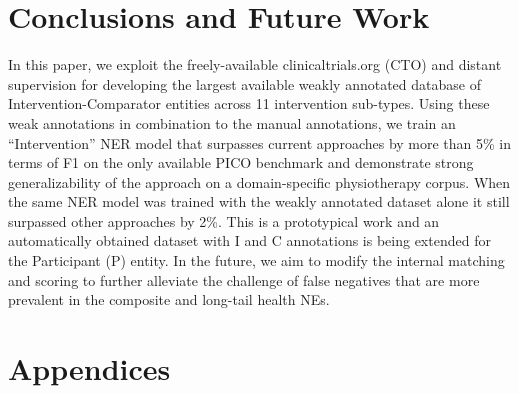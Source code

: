 \documentclass[letterpaper]{article} %
\begin{document}
\section{Conclusions and Future Work}
\label{sec:conclusion}
%
In this paper, we exploit the freely-available clinicaltrials.org (CTO) and distant supervision for developing the largest available weakly annotated database of Intervention-Comparator entities across 11 intervention sub-types.
Using these weak annotations in combination to the manual annotations, we train an ``Intervention'' NER model that surpasses current approaches by more than 5\% in terms of F1 on the only available PICO benchmark and demonstrate strong generalizability of the approach on a domain-specific physiotherapy corpus.
When the same NER model was trained with the weakly annotated dataset alone it still surpassed other approaches by 2\%.
This is a prototypical work and an automatically obtained dataset with I and C annotations is being extended for the Participant (P) entity.
In the future, we aim to modify the internal matching and scoring to further alleviate the challenge of false negatives that are more prevalent in the composite and long-tail health NEs.
%
%
\bigskip

\clearpage
\appendix
\section{Appendices}
\label{appendix}
%
\end{document}
